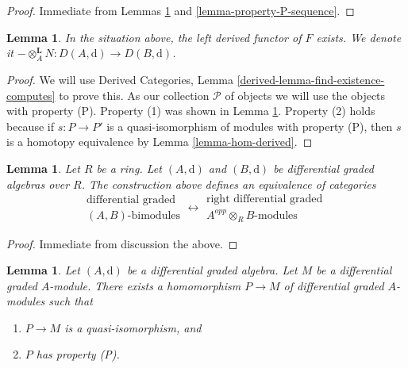 \documentclass{stacks-project}
\theoremstyle{plain}
\newtheorem{lemma}[subsection]{Lemma}
\theoremstyle{definition}
\theoremstyle{remark}
\numberwithin{equation}{subsection}
\begin{document}
\begin{proof}
Immediate from Lemmas \ref{lemma-bimodule-over-tensor} and
\ref{lemma-property-P-sequence}.
\end{proof}

\begin{lemma}
\label{lemma-derived-bc}
In the situation above, the left derived functor of $F$ exists.
We denote it
$- \otimes_A^\mathbf{L} N : D(A, \text{d}) \to D(B, \text{d})$.
\end{lemma}

\begin{proof}
We will use
Derived Categories, Lemma \ref{derived-lemma-find-existence-computes}
to prove this. As our collection $\mathcal{P}$
of objects we will use the objects with property (P).
Property (1) was shown in Lemma \ref{lemma-resolve}.
Property (2) holds because if $s : P \to P'$ is a quasi-isomorphism
of modules with property (P), then $s$ is a homotopy equivalence
by Lemma \ref{lemma-hom-derived}.
\end{proof}

\begin{lemma}
\label{lemma-bimodule-over-tensor}
Let $R$ be a ring. Let $(A, \text{d})$ and $(B, \text{d})$
be differential graded algebras over $R$. The construction above
defines an equivalence of categories
$$
\begin{matrix}
\text{differential graded}\\
(A, B)\text{-bimodules}
\end{matrix}
\longleftrightarrow
\begin{matrix}
\text{right differential graded }\\
A^{opp} \otimes_R B\text{-modules}
\end{matrix}
$$
\end{lemma}

\begin{proof}
Immediate from discussion the above.
\end{proof}

\begin{lemma}
\label{lemma-resolve}
Let $(A, \text{d})$ be a differential graded algebra.
Let $M$ be a differential graded $A$-module. There exists a homomorphism
$P \to M$ of differential graded $A$-modules such that
\begin{enumerate}
\item $P \to M$ is a quasi-isomorphism, and
\item $P$ has property (P).
\end{enumerate}
\end{lemma}
\end{document}
